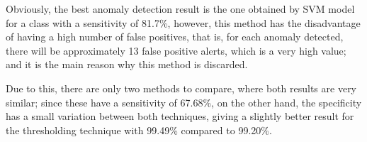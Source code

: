 Obviously, the best anomaly detection result is the one obtained by SVM model for a class with a sensitivity of 81.7\%, however, this method has the disadvantage of having a high number of false positives, that is, for each anomaly detected, there will be approximately 13 false positive alerts, which is a very high value; and it is the main reason why this method is discarded.

\vspace{5mm} %

Due to this, there are only two methods to compare, where both results are very similar; since these have a sensitivity of 67.68\%, on the other hand, the specificity has a small variation between both techniques, giving a slightly better result for the thresholding technique with 99.49\% compared to 99.20\%.

\vspace{5mm} %

